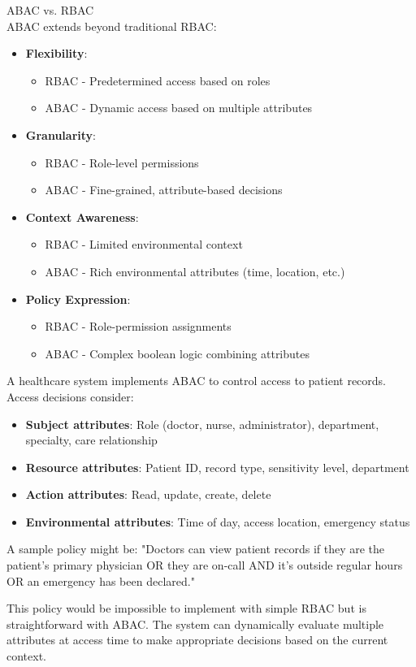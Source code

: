\begin{concept}{ABAC vs. RBAC}\\
ABAC extends beyond traditional RBAC:
\begin{itemize}
    \item \textbf{Flexibility}:
    \begin{itemize}
        \item RBAC - Predetermined access based on roles
        \item ABAC - Dynamic access based on multiple attributes
    \end{itemize}
    \item \textbf{Granularity}:
    \begin{itemize}
        \item RBAC - Role-level permissions
        \item ABAC - Fine-grained, attribute-based decisions
    \end{itemize}
    \item \textbf{Context Awareness}:
    \begin{itemize}
        \item RBAC - Limited environmental context
        \item ABAC - Rich environmental attributes (time, location, etc.)
    \end{itemize}
    \item \textbf{Policy Expression}:
    \begin{itemize}
        \item RBAC - Role-permission assignments
        \item ABAC - Complex boolean logic combining attributes
    \end{itemize}
\end{itemize}
\end{concept}

\begin{example}
A healthcare system implements ABAC to control access to patient records. Access decisions consider:

\begin{itemize}
    \item \textbf{Subject attributes}: Role (doctor, nurse, administrator), department, specialty, care relationship
    \item \textbf{Resource attributes}: Patient ID, record type, sensitivity level, department
    \item \textbf{Action attributes}: Read, update, create, delete
    \item \textbf{Environmental attributes}: Time of day, access location, emergency status
\end{itemize}

A sample policy might be: "Doctors can view patient records if they are the patient's primary physician OR they are on-call AND it's outside regular hours OR an emergency has been declared."

This policy would be impossible to implement with simple RBAC but is straightforward with ABAC. The system can dynamically evaluate multiple attributes at access time to make appropriate decisions based on the current context.
\end{example}

